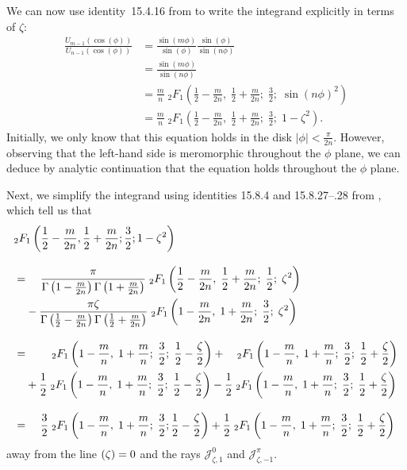 \documentclass{article}
\let\Re\relax
\DeclareMathOperator{\Re}{Re}
\theoremstyle{definition}
\theoremstyle{plain}
\begin{document}
We can now use identity~15.4.16 from \cite{dlmf} to write the integrand explicitly in terms of $\zeta$:
\begin{align*}
\frac{U_{m-1}(\cos(\phi))}{U_{n-1}(\cos(\phi))} &= \frac{\sin(m\phi)}{\sin(\phi)}\frac{\sin(\phi)}{\sin(n \phi)}\\
& = \frac{\sin(m\phi)}{\sin(n \phi)}\\
& = \frac{m}{n}\;{}_2F_1\left(\frac{1}{2} - \frac{m}{2n},\;\frac{1}{2} + \frac{m}{2n};\;\frac{3}{2};\;\sin(n \phi)^2\right) \\
& = \frac{m}{n}\;{}_2F_1\left(\frac{1}{2} - \frac{m}{2n},\;\frac{1}{2} + \frac{m}{2n};\;\frac{3}{2};\;1 - \zeta^2\right).
\end{align*}
Initially, we only know that this equation holds in the disk $|\phi| < \tfrac{\pi}{2n}$. However, observing that the left-hand side is meromorphic throughout the $\phi$ plane, we can deduce by analytic continuation that the equation holds throughout the $\phi$ plane.

Next, we simplify the integrand using identities 15.8.4 and 15.8.27\;--.28 from \cite{dlmf}, which tell us that\begin{align*}
&{}_2F_1\left(\frac{1}{2} - \frac{m}{2n}, \frac{1}{2} + \frac{m}{2n}; \frac{3}{2}; 1 - \zeta^2\right) \\[3mm]
& =\; \hphantom{+} \frac{\pi}{\Gamma\left(1-\frac{m}{2n}\right) \Gamma\left(1 + \frac{m}{2n}\right)}\;{}_2F_1\left(\frac{1}{2} - \frac{m}{2n},\;\frac{1}{2} + \frac{m}{2n};\;\frac{1}{2};\;\zeta^2\right) \\
& \hphantom{=}\; - \frac{\pi \zeta}{\Gamma\left(\frac{1}{2} - \frac{m}{2n}\right) \Gamma\left(\frac{1}{2} + \frac{m}{2n}\right)}\;{}_2F_1\left(1 - \frac{m}{2n},\;1 + \frac{m}{2n};\;\frac{3}{2};\;\zeta^2\right) \\[3mm]
& =\; \hphantom{+ \frac{0}{0}}\;{}_2F_1\left(1 - \frac{m}{n},\;1 + \frac{m}{n};\;\frac{3}{2};\;\frac{1}{2} - \frac{\zeta}{2}\right) + \hphantom{\frac{0}{0}}\;{}_2F_1\left(1-\frac{m}{n},\;1 + \frac{m}{n};\;\frac{3}{2};\;\frac{1}{2} + \frac{\zeta}{2}\right) \\
& \hphantom{=}\; + \frac{1}{2}\;{}_2F_1\left(1-\frac{m}{n},\;1+\frac{m}{n};\;\frac{3}{2};\;\frac{1}{2} - \frac{\zeta}{2}\right) - \frac{1}{2}\;{}_2F_1\left(1-\frac{m}{n},\;1 + \frac{m}{n};\;\frac{3}{2};\;\frac{1}{2} + \frac{\zeta}{2}\right) \\[3mm]
& =\; \hphantom{+} \frac{3}{2}\;{}_2F_1\left(1 - \frac{m}{n},\;1 + \frac{m}{n};\;\frac{3}{2};\frac{1}{2} - \frac{\zeta}{2}\right) + \frac{1}{2}\;{}_2F_1\left(1 - \frac{m}{n},\;1 + \frac{m}{n};\;\frac{3}{2};\;\frac{1}{2} + \frac{\zeta}{2}\right)
\end{align*}
away from the line $\Re(\zeta) = 0$ and the rays $\mathcal{J}^0_{\zeta,1}$ and $\mathcal{J}^\pi_{\zeta,-1}$.
\end{document}
